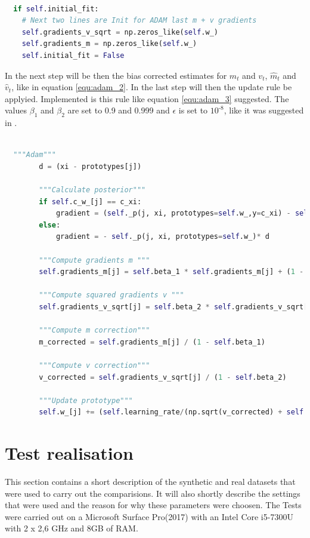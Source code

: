 \documentclass[12pt,oneside,a4paper,parskip]{scrbook}
\begin{document}
\begin{lstlisting}[label=lst:adam,
  language=python,
  firstnumber=1,
  caption= Modification of the \texttt{\_optimize} method to initialize $m_t$ and $v_t$.]			   

  if self.initial_fit:
    # Next two lines are Init for ADAM last m + v gradients
    self.gradients_v_sqrt = np.zeros_like(self.w_)
    self.gradients_m = np.zeros_like(self.w_)
    self.initial_fit = False
\end{lstlisting}

In the next step will be then the bias corrected estimates for $m_t$ and $v_t$, $\hat{m}_t$ and $\hat{v}_t$,
like in equation \ref{equ:adam_2}. 
In the last step will then the update rule be applyied. Implemented is this rule like equation \ref{equ:adam_3} suggested.
The values $\beta_1$ and $\beta_2$ are set to 0.9 and 0.999 and $\epsilon$ is set to $10^\textit{-8}$, like it was suggested in \cite{overvieDiffRSLVQ, Kingma2014AdamAM}.

\begin{lstlisting}[label=lst:adam,
  language=python,
  firstnumber=1,
  caption= Implementation of Adam on basis of \cite{PassiveDriftonRSLVQ}.]			   

  """Adam"""
        d = (xi - prototypes[j])

        """Calculate posterior"""
        if self.c_w_[j] == c_xi:
            gradient = (self._p(j, xi, prototypes=self.w_,y=c_xi) - self._p(j, xi, prototypes=self.w_))* d
        else:
            gradient = - self._p(j, xi, prototypes=self.w_)* d

        """Compute gradients m """
        self.gradients_m[j] = self.beta_1 * self.gradients_m[j] + (1 - self.beta_1) * gradient

        """Compute squared gradients v """
        self.gradients_v_sqrt[j] = self.beta_2 * self.gradients_v_sqrt[j] + (1 - self.beta_2) * gradient ** 2 

        """Compute m correction"""
        m_corrected = self.gradients_m[j] / (1 - self.beta_1)

        """Compute v correction"""
        v_corrected = self.gradients_v_sqrt[j] / (1 - self.beta_2)

        """Update prototype"""
        self.w_[j] += (self.learning_rate/(np.sqrt(v_corrected) + self.epsilon ))*m_corrected
\end{lstlisting}

\chapter{Test realisation}
This section contains a short description of the synthetic and real datasets that were used to carry out the comparisions.
It will also shortly describe the settings that were used and the reason for why these parameters were choosen.
The Tests were carried out on a Microsoft Surface Pro(2017) with an Intel Core i5-7300U with 2 x 2,6 GHz and 8GB of RAM.
\end{document}
